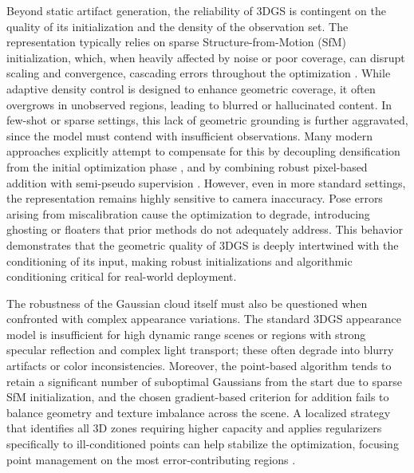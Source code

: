 \documentclass[11pt,a4paper]{article}
\begin{document}
Beyond static artifact generation, the reliability of 3DGS is contingent on the quality of its initialization and the density of the observation set. The representation typically relies on sparse Structure-from-Motion (SfM) initialization, which, when heavily affected by noise or poor coverage, can disrupt scaling and convergence, cascading errors throughout the optimization \cite{arxiv:2502.02283v6}. While adaptive density control is designed to enhance geometric coverage, it often overgrows in unobserved regions, leading to blurred or hallucinated content. In few-shot or sparse settings, this lack of geometric grounding is further aggravated, since the model must contend with insufficient observations. Many modern approaches explicitly attempt to compensate for this by decoupling densification from the initial optimization phase \cite{arxiv:2606.23212v1,arxiv:2312.16084v2}, and by combining robust pixel-based addition with semi-pseudo supervision \cite{arxiv:2603.01099v2,arxiv:2509.11003v2}. However, even in more standard settings, the representation remains highly sensitive to camera inaccuracy. Pose errors arising from miscalibration cause the optimization to degrade, introducing ghosting or floaters that prior methods do not adequately address. This behavior demonstrates that the geometric quality of 3DGS is deeply intertwined with the conditioning of its input, making robust initializations and algorithmic conditioning critical for real-world deployment.

The robustness of the Gaussian cloud itself must also be questioned when confronted with complex appearance variations. The standard 3DGS appearance model is insufficient for high dynamic range scenes or regions with strong specular reflection and complex light transport; these often degrade into blurry artifacts or color inconsistencies. Moreover, the point-based algorithm tends to retain a significant number of suboptimal Gaussians from the start due to sparse SfM initialization, and the chosen gradient-based criterion for addition fails to balance geometry and texture imbalance across the scene. A localized strategy that identifies all 3D zones requiring higher capacity and applies regularizers specifically to ill-conditioned points can help stabilize the optimization, focusing point management on the most error-contributing regions \cite{arxiv:2406.04251v2,arxiv:2605.14880v1}.
\end{document}

